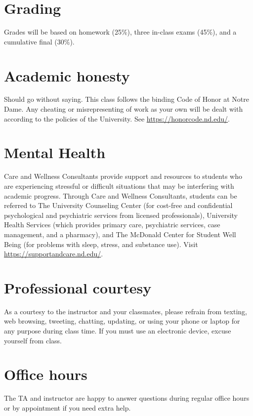 \documentclass[11pt]{article}
\begin{document}
\section{Grading}
\label{sec:org71268e2}
Grades will be based on homework (25\%), three in-class exams (45\%), and a cumulative final (30\%).

\section{Academic honesty}
\label{sec:orgb9c07b9}
Should go without saying. This class follows the binding Code of Honor
at Notre Dame.  Any cheating or misrepresenting of work as your own
will be dealt with according to the policies of the University.  See \url{https://honorcode.nd.edu/}.

\section{Mental Health}
\label{sec:org7b5fb9e}
Care and Wellness Consultants provide
support and resources to students who are experiencing stressful or difficult
situations that may be interfering with academic progress. Through Care and
Wellness Consultants, students can be referred to The University Counseling
Center (for cost-free and confidential psychological and psychiatric services from
licensed professionals), University Health Services (which provides primary care,
psychiatric services, case management, and a pharmacy), and The McDonald
Center for Student Well Being (for problems with sleep, stress, and substance
use). Visit \href{https://supportandcare.nd.edu/}{https://supportandcare.nd.edu/}.

\section{Professional courtesy}
\label{sec:org5c96497}
As a courtesy to the instructor and your classmates, please refrain from
texting, web browsing, tweeting, chatting, updating, or using your phone or laptop for any
purpose during class time.  If you must use an electronic device, excuse
yourself from class.

\section{Office hours}
\label{sec:orgb8a633a}
The TA and instructor are happy to answer questions during regular office hours or by appointment if you need extra help. 
\end{document}
